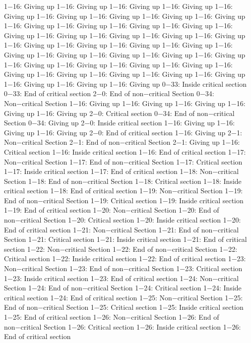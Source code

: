 1−16: Giving up
1−16: Giving up
1−16: Giving up
1−16: Giving up
1−16: Giving up
1−16: Giving up
1−16: Giving up
1−16: Giving up
1−16: Giving up
1−16: Giving up
1−16: Giving up
1−16: Giving up
1−16: Giving up
1−16: Giving up
1−16: Giving up
1−16: Giving up
1−16: Giving up
1−16: Giving up
1−16: Giving up
1−16: Giving up
1−16: Giving up
1−16: Giving up
1−16: Giving up
1−16: Giving up
1−16: Giving up
1−16: Giving up
1−16: Giving up
1−16: Giving up
1−16: Giving up
1−16: Giving up
1−16: Giving up
1−16: Giving up
1−16: Giving up
1−16: Giving up
1−16: Giving up
1−16: Giving up
1−16: Giving up
1−16: Giving up
1−16: Giving up
0−33: Inside critical section
0−33: End of critical section
2−0: End of non−critical Section
0−34: Non−critical Section
1−16: Giving up
1−16: Giving up
1−16: Giving up
1−16: Giving up
1−16: Giving up
2−0: Critical section
0−34: End of non−critical Section
0−34: Giving up
2−0: Inside critical section
1−16: Giving up
1−16: Giving up
1−16: Giving up
2−0: End of critical section
1−16: Giving up
2−1: Non−critical Section
2−1: End of non−critical Section
2−1: Giving up
1−16: Critical section
1−16: Inside critical section
1−16: End of critical section
1−17: Non−critical Section
1−17: End of non−critical Section
1−17: Critical section
1−17: Inside critical section
1−17: End of critical section
1−18: Non−critical Section
1−18: End of non−critical Section
1−18: Critical section
1−18: Inside critical section
1−18: End of critical section
1−19: Non−critical Section
1−19: End of non−critical Section
1−19: Critical section
1−19: Inside critical section
1−19: End of critical section
1−20: Non−critical Section
1−20: End of non−critical Section
1−20: Critical section
1−20: Inside critical section
1−20: End of critical section
1−21: Non−critical Section
1−21: End of non−critical Section
1−21: Critical section
1−21: Inside critical section
1−21: End of critical section
1−22: Non−critical Section
1−22: End of non−critical Section
1−22: Critical section
1−22: Inside critical section
1−22: End of critical section
1−23: Non−critical Section
1−23: End of non−critical Section
1−23: Critical section
1−23: Inside critical section
1−23: End of critical section
1−24: Non−critical Section
1−24: End of non−critical Section
1−24: Critical section
1−24: Inside critical section
1−24: End of critical section
1−25: Non−critical Section
1−25: End of non−critical Section
1−25: Critical section
1−25: Inside critical section
1−25: End of critical section
1−26: Non−critical Section
1−26: End of non−critical Section
1−26: Critical section
1−26: Inside critical section
1−26: End of critical section
